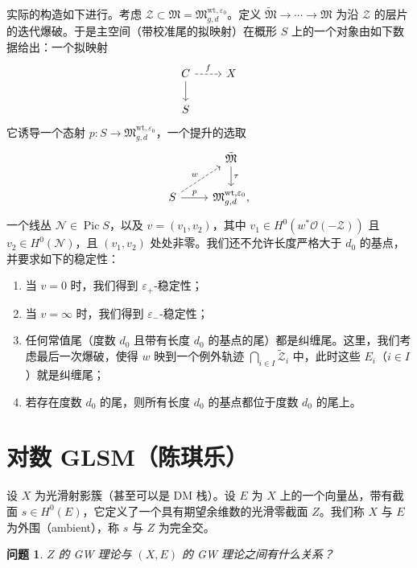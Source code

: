 \documentclass{amsart}
\newtheorem{quest}[thm]{问题}
\theoremstyle{definition}
\theoremstyle{remark}
\theoremstyle{plain}
\theoremstyle{definition}
\theoremstyle{remark}
\newcommand{\ep}{\varepsilon}
\newcommand{\mc}[1]{\mathcal{#1}}
\newcommand{\mf}[1]{\mathfrak{#1}}
\newcommand{\mr}[1]{\mathrm{#1}}
\newcommand{\1}{\mathbf{1}}
\newcommand{\2}{\mathbf{2}}
\newcommand{\3}{\mathbf{3}}
\DeclareMathOperator{\Pic}{Pic}
\begin{document}
实际的构造如下进行。考虑 \(\mc{Z} \subset \mf{M} = \mf{M}_{g,d}^{\mr{wt}, \ep_0}\)。定义 \(\tilde{\mf{M}} \to \cdots \to \mf{M}\) 为沿 \(\mc{Z}\) 的层片的迭代爆破。于是主空间（带校准尾的拟映射）在概形 \(S\) 上的一个对象由如下数据给出：一个拟映射
\begin{equation*}
\begin{tikzcd}
    C \ar{d} \ar[dashrightarrow]{r}{f} & X \\
    S
\end{tikzcd}
\end{equation*}
它诱导一个态射 \(p \colon S \to \mf{M}_{g,d}^{\mr{wt}, \ep_0}\)，一个提升的选取
\begin{equation*}
\begin{tikzcd}
    & \tilde{\mf{M}} \ar{d}{\tau} \\
    S \ar{r}{p} \ar[dashrightarrow]{ur}{w} & \mf{M}_{g,d}^{\mr{wt}, \ep_0},
\end{tikzcd}
\end{equation*}
一个线丛 \(\mc{N} \in \Pic S\)，以及 \(v = (v_1, v_2)\)，其中 \(v_1 \in H^0(w^* \mc{O}(-\mc{Z}))\) 且 \(v_2 \in H^0(\mc{N})\)，且 \((v_1, v_2)\) 处处非零。我们还不允许长度严格大于 \(d_0\) 的基点，并要求如下的稳定性：
\begin{enumerate}
    \item 当 \(v = 0\) 时，我们得到 \(\ep_+\)-稳定性；
    \item 当 \(v = \infty\) 时，我们得到 \(\ep_-\)-稳定性；
    \item 任何常值尾（度数 \(d_0\) 且带有长度 \(d_0\) 的基点的尾）都是纠缠尾。这里，我们考虑最后一次爆破，使得 \(w\) 映到一个例外轨迹 \(\bigcap_{i \in I} \tilde{\mc{Z}}_i\) 中，此时这些 \(E_i\)（\(i \in I\)）就是纠缠尾；
    \item 若存在度数 \(d_0\) 的尾，则所有长度 \(d_0\) 的基点都位于度数 \(d_0\) 的尾上。
\end{enumerate}






\section{对数 GLSM（陈琪乐）}%
\label{sec:Log GLSM (Qile Chen)}

设 \(X\) 为光滑射影簇（甚至可以是 DM 栈）。设 \(E\) 为 \(X\) 上的一个向量丛，带有截面 \(s \in H^0(E)\)，它定义了一个具有期望余维数的光滑零截面 \(Z\)。我们称 \(X\) 与 \(E\) 为外围（ambient），称 \(s\) 与 \(Z\) 为完全交。

\begin{quest}
    \(Z\) 的 GW 理论与 \((X, E)\) 的 GW 理论之间有什么关系？
\end{quest}
\end{document}
